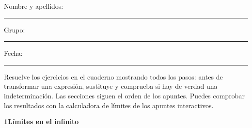 \documentclass[11pt,a4paper]{article}
\newcommand{\seccio}[2]{\par\needspace{16\baselineskip}\bigskip
  \begin{tcolorbox}[colback=navy,colframe=navy,coltext=white,arc=2mm,boxrule=0pt,left=3mm,right=3mm,top=1.2mm,bottom=1.2mm]
  {\large\bfseries #1\quad #2}
  \end{tcolorbox}\vspace{-2pt}}
\begin{document}
\thispagestyle{primera}

\vspace{10pt}
Nombre y apellidos: \rule{6.9cm}{0.4pt}\hfill Grupo: \rule{1.6cm}{0.4pt}\hfill Fecha: \rule{2.2cm}{0.4pt}
\vspace{8pt}

\begin{tcolorbox}[colback=soft,colframe=soft,arc=2mm,left=3mm,right=3mm,top=1.5mm,bottom=1.5mm]
\small Resuelve los ejercicios en el cuaderno mostrando todos los pasos: antes de transformar una expresión, sustituye y comprueba si hay de verdad una indeterminación. Las secciones siguen el orden de los apuntes. Puedes comprobar los resultados con la calculadora de límites de los apuntes interactivos.
\end{tcolorbox}

\seccio{1}{Límites en el infinito}
\end{document}
